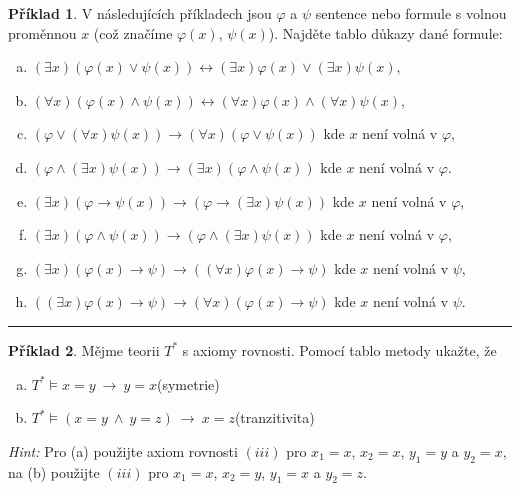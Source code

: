 \documentclass{amsart}
\theoremstyle{definition}
\newtheorem{problem}{Příklad}
\theoremstyle{remark}
\begin{document}
\medskip

\begin{problem} V následujících příkladech jsou $\varphi$ a $\psi$ sentence nebo formule s volnou proměnnou $x$ (což značíme $\varphi(x)$, $\psi(x)$). Najděte tablo důkazy dané formule:
\begin{enumerate}[(a)]
\itemsep6pt
\item $(\exists x)(\varphi(x)\vee \psi(x))\leftrightarrow (\exists x)\varphi(x)\vee (\exists x)\psi(x)$,
\item $(\forall x)(\varphi(x)\wedge\psi(x))\leftrightarrow (\forall x)\varphi(x)\wedge(\forall x)\psi(x)$,
\item $(\varphi \vee (\forall x)\psi(x))\to (\forall x)(\varphi \vee \psi(x))$ kde $x$ není volná v $\varphi$,
\item $(\varphi \wedge (\exists x)\psi(x))\to (\exists x)(\varphi \wedge \psi(x))$ kde $x$ není volná v $\varphi$.
\item $(\exists x)(\varphi \to \psi(x))\to(\varphi \to (\exists x)\psi(x))$ kde $x$ není volná v $\varphi$,
\item $(\exists x)(\varphi \wedge \psi(x))\to(\varphi \wedge (\exists x)\psi(x))$ kde $x$ není volná v $\varphi$,
\item $(\exists x)(\varphi(x)\to\psi)\to((\forall x)\varphi(x)\to \psi)$ kde $x$ není volná v $\psi$,
\item $((\exists x)\varphi(x)\to\psi)\to(\forall x)(\varphi(x)\to \psi)$ kde $x$ není volná v $\psi$.
\end{enumerate}
\end{problem} 

\medskip
\hrule

\begin{problem} Mějme teorii $T^*$ s axiomy rovnosti. Pomocí tablo metody ukažte, že 
\begin{enumerate}[(a)]
\itemsep6pt
\item $T^*\models x=y\ \to\ y=x$\hfill(symetrie)
\item $T^*\models (x=y\ \wedge\ y=z)\ \to\ x=z$\hfill(tranzitivita)
\end{enumerate}

\medskip
{\it Hint:} Pro (a) použijte axiom rovnosti $(iii)$ pro $x_1=x$, $x_2=x$, $y_1=y$ a $y_2=x$, \newline
na (b) použijte $(iii)$ pro $x_1=x$, $x_2=y$, $y_1=x$ a $y_2=z$.
\end{problem} 
\end{document}
